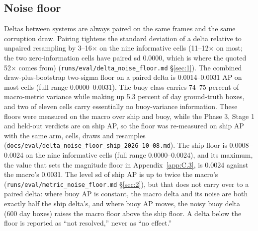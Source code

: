 \documentclass[10pt]{article}
\begin{document}
\subsection{Noise floor}\label{app:C.2}
Deltas between systems are always paired on the same frames and the same corruption draw. Pairing tightens the standard deviation of a delta relative to unpaired resampling by 3--16$\times$ on the nine informative cells (11--12$\times$ on most; the two zero-information cells have paired sd 0.0000, which is where the quoted 52$\times$ comes from) (\texttt{runs/\allowbreak{}eval/\allowbreak{}delta\_\allowbreak{}noise\_\allowbreak{}floor.md} \S\ref{sec:1}). The combined draw-plus-bootstrap two-sigma floor on a paired delta is 0.0014--0.0031 AP on most cells (full range 0.0000--0.0031). The buoy class carries 74--75 percent of macro-metric variance while making up 5.3 percent of day ground-truth boxes, and two of eleven cells carry essentially no buoy-variance information. These floors were measured on the macro over ship and buoy, while the Phase 3, Stage 1 and held-out verdicts are on ship AP, so the floor was re-measured on ship AP with the same arm, cells, draws and resamples (\texttt{docs/\allowbreak{}eval/\allowbreak{}delta\_\allowbreak{}noise\_\allowbreak{}floor\_\allowbreak{}ship\_\allowbreak{}2026-10-08.md}). The ship floor is 0.0008--0.0024 on the nine informative cells (full range 0.0000--0.0024), and its maximum, the value that sets the magnitude floor in Appendix~\ref{app:C.3}, is 0.0024 against the macro's 0.0031. The level sd of ship AP is up to twice the macro's (\texttt{runs/\allowbreak{}eval/\allowbreak{}metric\_\allowbreak{}noise\_\allowbreak{}floor.md} \S\ref{sec:2}), but that does not carry over to a paired delta: where buoy AP is constant, the macro delta and its noise are both exactly half the ship delta's, and where buoy AP moves, the noisy buoy delta (600 day boxes) raises the macro floor above the ship floor. A delta below the floor is reported as ``not resolved,'' never as ``no effect.''
\end{document}
